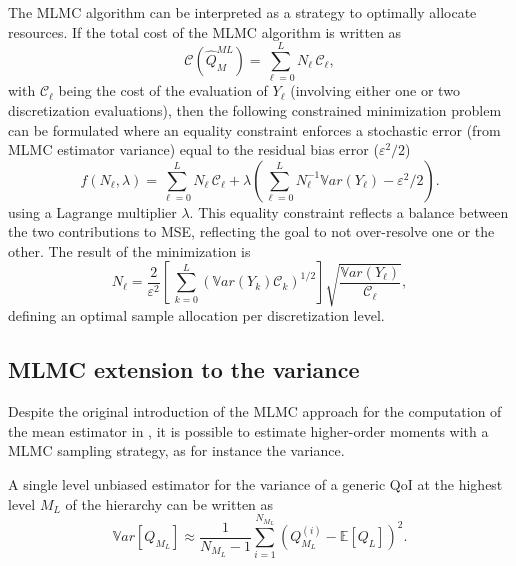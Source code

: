 The MLMC algorithm can be interpreted as a strategy to optimally allocate 
resources. If the total cost of the MLMC algorithm is written as  
\begin{equation}\label{EQ: MLMC cost}
\mathcal{C}(\hat{Q}^{ML}_{M}) = \sum_{\ell=0}^{L} N_\ell \, \mathcal{C}_{\ell},
\end{equation}
with $\mathcal{C}_{\ell}$ being the cost of the evaluation of $Y_\ell$ (involving either one or two discretization evaluations), then the following constrained minimization problem can be formulated where an equality constraint enforces a stochastic error (from MLMC estimator variance) equal to the residual bias error ($\varepsilon^2/2$)
\begin{equation}\label{EQ:mlmc_optimization}
 f(N_\ell,\lambda) = \sum_{\ell=0}^{L} N_\ell \, \mathcal{C}_{\ell} 
                   + \lambda \left( \sum_{\ell=0}^{L} N_\ell^{-1} \mathbb{V}ar\left({Y_\ell}\right) - \varepsilon^2/2 \right). 
\end{equation}
using a Lagrange multiplier $\lambda$.  This equality constraint reflects a balance between the two contributions to MSE, reflecting the goal to not over-resolve one or the other.  The result of the minimization is
\begin{equation}\label{EQ: MLMC nl}
N_{\ell} = \frac{2}{\varepsilon^2} \left[ \, \sum_{k=0}^L \left( \mathbb{V}ar\left(Y_k\right) \mathcal{C}_k \right)^{1/2} \right] 
               \sqrt{\frac{ \mathbb{V}ar\left({Y_\ell}\right) }{\mathcal{C}_{\ell}}},
\end{equation}
defining an optimal sample allocation per discretization level.

\subsection{MLMC extension to the variance}
Despite the original introduction of the MLMC approach for the computation of the mean estimator in \cite{Giles2008,Giles2015}, it is 
possible to estimate higher-order moments with a MLMC sampling strategy, as for instance the variance.

A single level unbiased estimator for the variance of a generic QoI at the highest level $M_L$ of the hierarchy can be written as
\begin{equation}
\label{eq: variance_est_single_level}
 \mathbb{V}ar\left[Q_{M_L}\right] \approx \frac{1}{N_{M_L} - 1} \sum_{i=1}^{N_{M_L}} \left( Q_{M_L}^{(i)} - \mathbb{E}\left[Q_L\right] \right)^2.
\end{equation}

